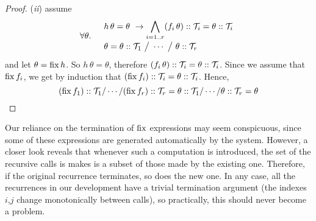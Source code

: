 \begin{proof}
({\it ii}) assume
\[\renewcommand\arraystretch{1.3}
  \forall\theta. \quad
  \begin{array}{l}
  \displaystyle
    h\,\theta = \theta ~\limplies \bigwedge_{i=1..r}(f_i\,\theta)::\T_i = \theta::\T_i \\
    \theta = \theta::\T_1 ~\big/~ \cdots ~\big/~ \theta::\T_r
  \end{array}  
\]
%
and let $\theta=\operatorname{fix} h$. So $h\,\theta=\theta$, therefore $(f_i\,\theta)::\mathcal{T}_i=\theta::\mathcal{T}_i$.
Since we assume that $\operatorname{fix} f_i$, we get by induction that $(\operatorname{fix} f_i)::\mathcal{T}_i=\theta::\mathcal{T}_i$.
Hence,
\[(\operatorname{fix} f_1)::\mathcal{T}_1 / \cdots / (\operatorname{fix} f_r)::\mathcal{T}_r = \theta::\mathcal{T}_1 / \cdots / \theta::\mathcal{T}_r = \theta\]
\end{proof}

\medskip
Our reliance on the termination of $\operatorname{fix}$ expressions may seem conspicuous, since some of these
expressions are generated automatically by the system. However, a closer look reveals that whenever
such a computation is introduced, the set of the recursive calls is makes is a subset of those made by the existing one.
Therefore, if the original recurrence terminates, so does the new one. In any case, all the recurrences
in our development have a trivial termination argument (the indexes $i$,$j$ change monotonically between calls),
so practically, this should never become a problem.
